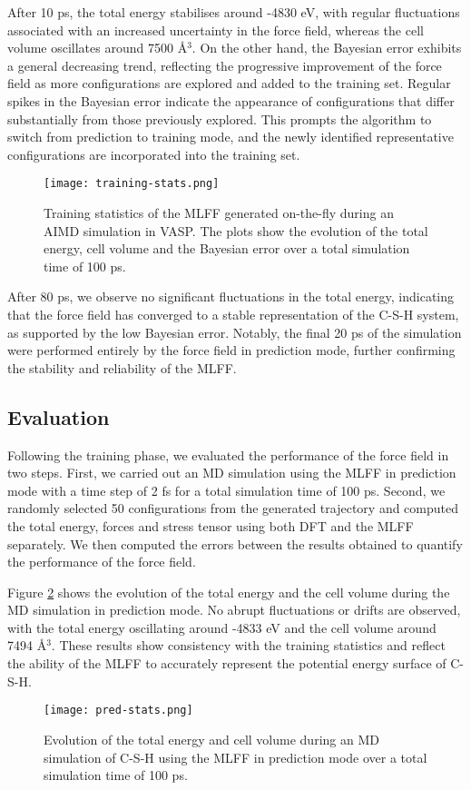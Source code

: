 After 10 ps, the total energy stabilises around -4830 eV, with regular fluctuations associated with an increased uncertainty in the force field, whereas the cell volume oscillates around 7500 \AA$^3$. On the other hand, the Bayesian error exhibits a general decreasing trend, reflecting the progressive improvement of the force field as more configurations are explored and added to the training set. Regular spikes in the Bayesian error indicate the appearance of configurations that differ substantially from those previously explored. This prompts the algorithm to switch from prediction to training mode, and the newly identified representative configurations are incorporated into the training set. 
\begin{figure}[H]
    \centering
    \texttt{[image: training-stats.png]}
    \caption{
    Training statistics of the MLFF generated on-the-fly during an AIMD simulation in VASP. The plots show the evolution of the total energy, cell volume and the Bayesian error over a total simulation time of 100 ps. 
    }
    \label{training-stats}
\end{figure}

After 80 ps, we observe no significant fluctuations in the total energy, indicating that the force field has converged to a stable representation of the C-S-H system, as supported by the low Bayesian error. Notably, the final 20 ps of the simulation were performed entirely by the force field in prediction mode, further confirming the stability and reliability of the MLFF.

\subsection{Evaluation}
Following the training phase, we evaluated the performance of the force field in two steps. First, we carried out an MD simulation using the MLFF in prediction mode with a time step of 2 fs for a total simulation time of 100 ps. Second, we randomly selected 50 configurations from the generated trajectory and computed the total energy, forces and stress tensor using both DFT and the MLFF separately. We then computed the errors between the results obtained to quantify the performance of the force field. 

Figure \ref{pred-stats} shows the evolution of the total energy and the cell volume during the MD simulation in prediction mode. No abrupt fluctuations or drifts are observed, with the total energy oscillating around -4833 eV and the cell volume around 7494 \AA$^3$. These results show consistency with the training statistics and reflect the ability of the MLFF to accurately represent the potential energy surface of C-S-H. 
\begin{figure}[h!]
    \centering
    \texttt{[image: pred-stats.png]}
    \caption{
    Evolution of the total energy and cell volume during an MD simulation of C-S-H using the MLFF in prediction mode over a total simulation time of 100 ps.  
    }
    \label{pred-stats}
\end{figure}


